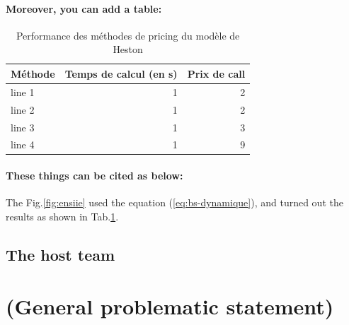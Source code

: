 \begin{sloppypar}
\paragraph{Moreover, you can add a table: }
\begin{table}[H]
    \centering
    \begin{tabular}{lrr}
    \hline
        Méthode & Temps de calcul (en s) & Prix de call \\
    \hline
        line 1 & 1 & 2 \\
        line 2 & 1 & 2 \\
        line 3 & 1 & 3 \\
        line 4 & 1 & 9 \\
    \hline
    \end{tabular}
    \caption{Performance des méthodes de pricing du modèle de Heston}
    \label{tab:heston_methods} %
\end{table}

\paragraph{These things can be cited as below: }

The Fig.\ref{fig:ensiie} used the equation (\ref{eq:bs-dynamique}), and turned out the results as shown in Tab.\ref{tab:heston_methods}.




\subsection{The host team}
















\newpage
\section{(General problematic statement)}





\end{sloppypar}
